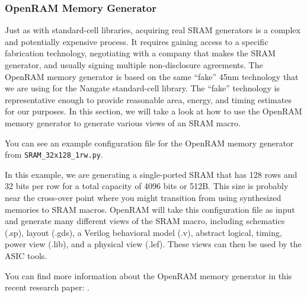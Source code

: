 \documentclass[a4paper,12pt,twoside]{article}
\begin{document}
\subsubsection{OpenRAM Memory Generator}
Just as with standard-cell libraries, acquiring real SRAM generators is a complex and potentially expensive process. It requires gaining access to a specific fabrication technology, negotiating with a company that makes the SRAM generator, and usually signing multiple non-disclosure agreements. The OpenRAM memory generator is based on the same “fake” 45nm technology that we are using for the Nangate standard-cell library. The “fake” technology is representative enough to provide reasonable area, energy, and timing estimates for our purposes. In this section, we will take a look at how to use the OpenRAM memory generator to generate various views of an SRAM macro.

You can see an example configuration file for the OpenRAM memory generator from \texttt{SRAM\_32x128\_1rw.py}.

In this example, we are generating a single-ported SRAM that has 128 rows and 32 bits per row for a total capacity of 4096 bits or 512B. This size is probably near the cross-over point where you might transition from using synthesized memories to SRAM macros. OpenRAM will take this configuration file as input and generate many different views of the SRAM macro, including schematics (.sp), layout (.gds), a Verilog behavioral model (.v), abstract logical, timing, power view (.lib), and a physical view (.lef). These views can then be used by the ASIC tools.

You can find more information about the OpenRAM memory generator in this recent research paper: \cite{10.1145/2966986.2980098}.
\end{document}

